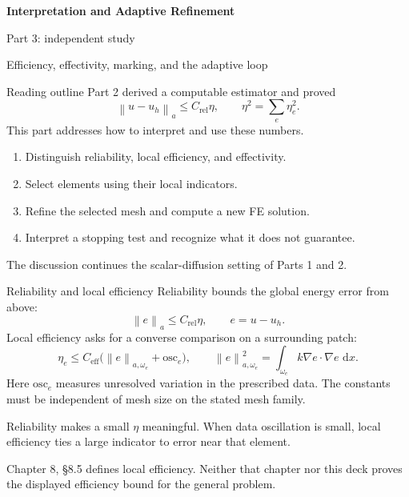 \documentclass[11pt,aspectratio=169]{beamer}
\newcommand{\dd}{\,\mathrm{d}}
\newcommand{\norm}[2][]{\left\lVert#2\right\rVert_{#1}}
\newcommand{\grad}{\nabla}
\begin{document}
\begin{frame}[plain]
  \centering\vfill
  {\LARGE\bfseries Interpretation and Adaptive Refinement\par}
  \vspace{0.45cm}
  {\large Part 3: independent study\par}
  \vspace{0.25cm}
  {\large Efficiency, effectivity, marking, and the adaptive loop\par}
  \vfill
\end{frame}

\begin{frame}{Reading outline}
Part 2 derived a computable estimator and proved
\[
 \norm[a]{u-u_h}\leq C_{\mathrm{rel}}\eta,
 \qquad \eta^2=\sum_e\eta_e^2.
\]
This part addresses how to interpret and use these numbers.
\begin{enumerate}
 \item Distinguish reliability, local efficiency, and effectivity.
 \item Select elements using their local indicators.
 \item Refine the selected mesh and compute a new FE solution.
 \item Interpret a stopping test and recognize what it does not guarantee.
\end{enumerate}
The discussion continues the scalar-diffusion setting of Parts 1 and 2.
\end{frame}

\begin{frame}{Reliability and local efficiency}
Reliability bounds the global energy error from above:
\[
 \norm[a]{e}\leq C_{\mathrm{rel}}\eta,
 \qquad e=u-u_h.
\]
Local efficiency asks for a converse comparison on a surrounding patch:
\[
 \eta_e\leq C_{\mathrm{eff}}
 \bigl(\norm[a,\omega_e]{e}+\mathrm{osc}_e\bigr),
 \qquad
 \norm[a,\omega_e]{e}^2=\int_{\omega_e}k\grad e\cdot\grad e\,\dd x.
\]
Here $\mathrm{osc}_e$ measures unresolved variation in the prescribed data.
The constants must be independent of mesh size on the stated mesh family.

Reliability makes a small $\eta$ meaningful. When data oscillation is small,
local efficiency ties a large indicator to error near that element.

\vspace{0.12cm}
{\footnotesize Chapter 8, \S8.5 defines local efficiency. Neither that chapter
nor this deck proves the displayed efficiency bound for the general problem.}
\end{frame}
\end{document}
